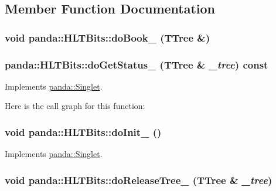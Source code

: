\subsection{Member Function Documentation}
\hypertarget{classpanda_1_1HLTBits_a9ed1eb7a9deebf34f8d9458dbf021407}{
\subsubsection[{doBook\_\-}]{\setlength{\rightskip}{0pt plus 5cm}void panda::HLTBits::doBook\_\- (TTree \&)}}
\label{classpanda_1_1HLTBits_a9ed1eb7a9deebf34f8d9458dbf021407}
\hypertarget{classpanda_1_1HLTBits_a25f37a9baf25b848fb303f8d08daa027}{
\subsubsection[{doGetStatus\_\-}]{ panda::HLTBits::doGetStatus\_\- (TTree \& {\em \_\-tree}) const}}
\label{classpanda_1_1HLTBits_a25f37a9baf25b848fb303f8d08daa027}


Implements \hyperlink{classpanda_1_1Singlet_ad2749c2f28a2970eda99db906a116881}{panda::Singlet}.

Here is the call graph for this function:\hypertarget{classpanda_1_1HLTBits_a6851af7cebb5cb7a09aa7a76d42e5848}{
\subsubsection[{doInit\_\-}]{\setlength{\rightskip}{0pt plus 5cm}void panda::HLTBits::doInit\_\- ()}}
\label{classpanda_1_1HLTBits_a6851af7cebb5cb7a09aa7a76d42e5848}


Implements \hyperlink{classpanda_1_1Singlet_af5afe7bf7b223c51d1763953ac24d261}{panda::Singlet}.\hypertarget{classpanda_1_1HLTBits_aa18c8ff3c69a7ab522df688d5680dcdd}{
\subsubsection[{doReleaseTree\_\-}]{\setlength{\rightskip}{0pt plus 5cm}void panda::HLTBits::doReleaseTree\_\- (TTree \& {\em \_\-tree})}}
\label{classpanda_1_1HLTBits_aa18c8ff3c69a7ab522df688d5680dcdd}


